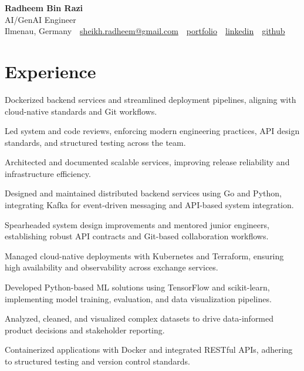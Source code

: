 \documentclass[11pt,a4paper]{resume}
\makeatletter
\newcommand{\Portfolio}{https://radheem.github.io/my-cv}
\newcommand{\PortfolioText}{portfolio}
\newcommand{\GitHub}{https://github.com/radheem}
\newcommand{\LinkedIn}{https://www.linkedin.com/in/radheem-razi}
\newcommand{\Email}{sheikh.radheem@gmail.com}
\makeatother
\begin{document}
\begin{center}
  {\huge\bfseries Radheem Bin Razi}\\[3pt]
  {\large AI/GenAI Engineer}\\[6pt]
  \small
  Ilmenau, Germany \,\textbar\,
  \href{mailto:\Email}{\Email} \,\textbar\,
  \href{\Portfolio}{\PortfolioText} \,\textbar\,
  \href{\LinkedIn}{linkedin} \,\textbar\,
  \href{\GitHub}{github}
\end{center}
\vspace{2pt}

\section{Experience}

\bullets
  \item Dockerized backend services and streamlined deployment pipelines, aligning with cloud-native standards and Git workflows.
  \item Led system and code reviews, enforcing modern engineering practices, API design standards, and structured testing across the team.
  \item Architected and documented scalable services, improving release reliability and infrastructure efficiency.
\bulletsend
\vspace{3pt}
\bullets
  \item Designed and maintained distributed backend services using Go and Python, integrating Kafka for event-driven messaging and API-based system integration.
  \item Spearheaded system design improvements and mentored junior engineers, establishing robust API contracts and Git-based collaboration workflows.
  \item Managed cloud-native deployments with Kubernetes and Terraform, ensuring high availability and observability across exchange services.
\bulletsend
\vspace{3pt}
\bullets
  \item Developed Python-based ML solutions using TensorFlow and scikit-learn, implementing model training, evaluation, and data visualization pipelines.
  \item Analyzed, cleaned, and visualized complex datasets to drive data-informed product decisions and stakeholder reporting.
  \item Containerized applications with Docker and integrated RESTful APIs, adhering to structured testing and version control standards.
\bulletsend
\vspace{3pt}
\end{document}
